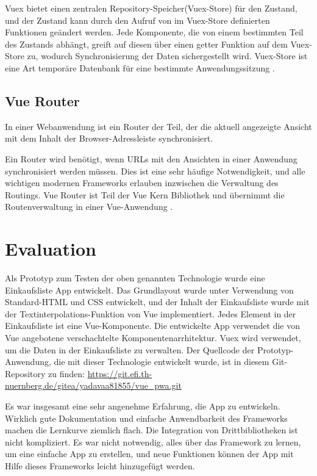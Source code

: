 Vuex bietet einen zentralen Repository-Speicher(Vuex-Store) für den Zustand, und der Zustand kann durch den Aufruf von im Vuex-Store definierten Funktionen geändert werden.
Jede Komponente, die von einem bestimmten Teil des Zustands abhängt, greift auf diesen über einen getter Funktion auf dem Vuex-Store zu, wodurch Synchronisierung der Daten sichergestellt wird. Vuex-Store ist eine Art temporäre Datenbank für eine bestimmte Anwendungssitzung \cite{VueGuide:Online}.


\section{Vue Router }
\label{sec:Vue Router}

In einer Webanwendung ist ein Router der Teil, der die aktuell angezeigte Ansicht mit dem Inhalt der Browser-Adressleiste synchronisiert.

Ein Router wird benötigt, wenn \gls{URL}s mit den Ansichten in einer Anwendung synchronisiert werden müssen. Dies ist eine sehr häufige Notwendigkeit, und alle wichtigen modernen Frameworks erlauben inzwischen die Verwaltung des Routings.   Vue Router ist Teil der Vue Kern Bibliothek und übernimmt die Routenverwaltung in einer Vue-Anwendung \cite{VueGuide:Online}.

\newpage
{\let\clearpage\relax \chapter{Evaluation}}

Als Prototyp zum Testen der oben genannten Technologie wurde eine Einkaufsliste App entwickelt. Das Grundlayout wurde unter Verwendung von Standard-HTML und CSS entwickelt, und der Inhalt der Einkaufsliste wurde mit der Textinterpolations-Funktion von Vue implementiert. Jedes Element in der Einkaufsliste ist eine Vue-Komponente. Die entwickelte App verwendet die von Vue angebotene verschachtelte Komponentenarrhitektur. Vuex wird verwendet, um die Daten in der Einkaufsliste zu verwalten.
Der Quellcode der Prototyp-Anwendung, die mit dieser Technologie entwickelt wurde, ist in diesem Git-Repository zu finden: \url{https://git.efi.th-nuernberg.de/gitea/yadavaa81855/vue_pwa.git}

Es war insgesamt eine sehr angenehme Erfahrung, die App zu entwickeln. Wirklich gute Dokumentation und einfache Anwendbarkeit des Frameworks machen die Lernkurve ziemlich flach. Die Integration von Drittbibliotheken ist nicht kompliziert. Es war nicht notwendig, alles über das Framework zu lernen, um eine einfache App zu erstellen, und neue Funktionen können der App mit Hilfe dieses Frameworks leicht hinzugefügt werden.

